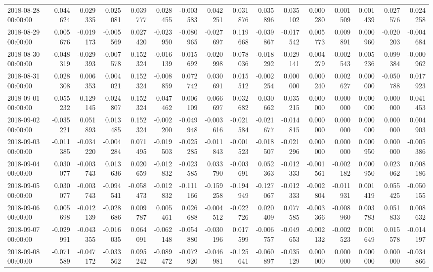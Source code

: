 \begin{tabular}{lrrrrrrrrrrrrrrr}
2018-08-28 00:00:00 & 0.044624 & 0.029335 & 0.025081 & 0.039777 & 0.028455 & -0.003583 & 0.042251 & 0.031876 & 0.035896 & 0.035102 & 0.000280 & 0.001509 & 0.001439 & 0.027576 & 0.024258 \\
2018-08-29 00:00:00 & 0.005676 & -0.019173 & -0.005569 & 0.027420 & -0.023950 & -0.080965 & -0.027697 & 0.119668 & -0.039867 & -0.017542 & 0.005773 & 0.009891 & 0.000960 & -0.020203 & -0.004684 \\
2018-08-30 00:00:00 & -0.048319 & -0.029393 & -0.007578 & 0.152324 & -0.016139 & -0.015692 & -0.020998 & -0.078036 & -0.018292 & -0.029141 & -0.004279 & -0.002543 & 0.005236 & 0.099384 & -0.000962 \\
2018-08-31 00:00:00 & 0.028308 & 0.006353 & 0.004021 & 0.152324 & -0.008859 & 0.072742 & 0.030691 & 0.015512 & -0.002254 & 0.000000 & 0.000240 & 0.002627 & 0.000000 & -0.050788 & 0.017923 \\
2018-09-01 00:00:00 & 0.055232 & 0.129145 & 0.024807 & 0.152324 & 0.047462 & 0.006109 & 0.066697 & 0.032682 & 0.030662 & 0.035215 & 0.000000 & 0.000000 & 0.000000 & 0.000000 & 0.041453 \\
2018-09-02 00:00:00 & -0.035221 & 0.051893 & 0.013485 & 0.152324 & -0.002200 & -0.049948 & -0.003616 & -0.021584 & -0.021677 & -0.014815 & 0.000000 & 0.000000 & 0.000000 & 0.000000 & 0.004903 \\
2018-09-03 00:00:00 & -0.011385 & -0.034220 & -0.004284 & 0.071495 & -0.019503 & -0.025285 & -0.011843 & -0.001523 & -0.018507 & -0.021296 & 0.000000 & 0.000000 & 0.000950 & 0.000000 & -0.005386 \\
2018-09-04 00:00:00 & 0.030077 & -0.003743 & 0.013636 & 0.020659 & -0.012832 & -0.023585 & 0.033790 & -0.003691 & 0.052363 & -0.012333 & -0.001561 & -0.002182 & 0.000950 & 0.023062 & 0.008186 \\
2018-09-05 00:00:00 & 0.030077 & -0.003743 & -0.094541 & -0.058473 & -0.012832 & -0.111166 & -0.159258 & -0.194949 & -0.127067 & -0.012333 & -0.002804 & -0.011931 & 0.001419 & 0.055425 & -0.050155 \\
2018-09-06 00:00:00 & 0.005698 & -0.012139 & -0.028686 & 0.009787 & 0.005461 & 0.026688 & -0.004512 & -0.022726 & 0.020409 & 0.077585 & -0.003366 & -0.008960 & 0.003783 & 0.051833 & 0.008632 \\
2018-09-07 00:00:00 & -0.029991 & -0.043355 & -0.016035 & 0.064091 & -0.062148 & -0.054880 & -0.030196 & 0.017599 & -0.006757 & -0.049653 & -0.002132 & -0.002523 & 0.001649 & 0.015578 & -0.014197 \\
2018-09-08 00:00:00 & -0.071589 & -0.047172 & -0.033562 & 0.095242 & -0.089472 & -0.072920 & -0.046981 & -0.125641 & -0.060897 & -0.035129 & 0.000000 & 0.000000 & 0.000000 & 0.000000 & -0.034866 \\

\end{tabular}
